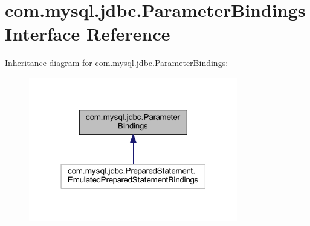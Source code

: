 \hypertarget{interfacecom_1_1mysql_1_1jdbc_1_1_parameter_bindings}{}\section{com.\+mysql.\+jdbc.\+Parameter\+Bindings Interface Reference}
\label{interfacecom_1_1mysql_1_1jdbc_1_1_parameter_bindings}


Inheritance diagram for com.\+mysql.\+jdbc.\+Parameter\+Bindings\+:
\nopagebreak
\begin{figure}[H]
\begin{center}
\leavevmode
\includegraphics[width=259pt]{interfacecom_1_1mysql_1_1jdbc_1_1_parameter_bindings__inherit__graph}
\end{center}
\end{figure}
